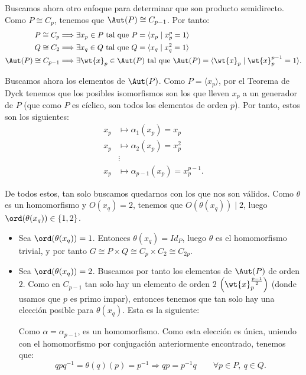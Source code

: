 \begin{ejercicio}
    Buscamos ahora otro enfoque para determinar que son producto semidirecto. Como \(P\cong C_p\), tenemos que \(\Aut(P)\cong C_{p-1}\). Por tanto:
    \begin{align*}
        P\cong C_p
        \Longrightarrow \exists &x_p\in P\text{ tal que } P=\langle x_p\mid x_p^p=1\rangle\\
        Q\cong C_2
        \Longrightarrow \exists &x_q\in Q\text{ tal que } Q=\langle x_q\mid x_q^2=1\rangle\\
        \Aut(P)\cong C_{p-1}
        \Longrightarrow \exists &\wt{x}_p\in \Aut(P)\text{ tal que } \Aut(P)=\langle \wt{x}_p\mid \wt{x}_p^{p-1}=1\rangle.
    \end{align*}

    Buscamos ahora los elementos de $\Aut(P)$.
    Como $P=\langle x_p\rangle$, por el Teorema de Dyck tenemos que los posibles isomorfismos son los que lleven \(x_p\) a un generador de \(P\) (que como \(P\) es cíclico, son todos los elementos de orden \(p\)). Por tanto, estos son los siguientes:
    \begin{align*}
        x_p & \mapsto \alpha_1(x_p) = x_p\\
        x_p & \mapsto \alpha_2(x_p) = x_p^2\\
        &\vdots\\
        x_p & \mapsto \alpha_{p-1}(x_p) = x_p^{p-1}.
    \end{align*}

    De todos estos, tan solo buscamos quedarnos con los que nos son válidos.
    Como $\theta$ es un homomorfismo y $O(x_q)=2$, tenemos que $O(\theta(x_q))\mid 2$, luego \(\ord(\theta(x_q))\in \{1,2\}\).
    \begin{itemize}
        \item Sea \(\ord(\theta(x_q)) = 1\). Entonces \(\theta(x_q) = Id_P\), luego $\theta$ es el homomorfismo trivial, y por tanto \(G\cong P\times Q\cong C_p\times C_2\cong C_{2p}\).
        \item Sea \(\ord(\theta(x_q)) = 2\). Buscamos por tanto los elementos de \(\Aut(P)\) de orden \(2\). Como en $C_{p-1}$ tan solo hay un elemento de orden \(2\) $\left(\wt{x}_p^{\frac{p-1}{2}}\right)$ (donde usamos que \(p\) es primo impar), entonces tenemos que tan solo hay una elección posible para \(\theta(x_q)\). Esta es la siguiente:

        Como \(\alpha=\alpha_{p-1}\), es un homomorfismo. Como esta elección es única, uniendo con el homomorfismo por conjugación anteriormente encontrado, tenemos que:
        \begin{equation*}
            qpq^{-1} = \theta(q)(p) = p^{-1}
            \Longrightarrow qp=p^{-1}q\qquad \forall p\in P,\ q\in Q.
        \end{equation*}


\end{itemize}
\end{ejercicio}
